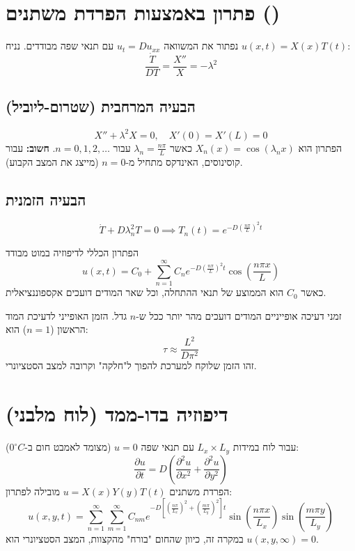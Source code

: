 \section{פתרון באמצעות הפרדת משתנים ()}
נפתור את המשוואה $u_t = D u_{xx}$ עם תנאי שפה מבודדים. נניח $u(x,t) = X(x)T(t)$:
\[ \frac{\dot{T}}{DT} = \frac{X''}{X} = -\lambda^2 \]

\subsection{הבעיה המרחבית (שטרום-ליוביל)}
\[ X'' + \lambda^2 X = 0, \quad X'(0) = X'(L) = 0 \]
הפתרון הוא $X_n(x) = \cos(\lambda_n x)$ כאשר $\lambda_n = \frac{n\pi}{L}$ עבור $n=0, 1, 2, \dots$. 
\textbf{חשוב:} עבור קוסינוסים, האינדקס מתחיל מ-$n=0$ (מייצג את המצב הקבוע).

\subsection{הבעיה הזמנית}
\[ \dot{T} + D\lambda_n^2 T = 0 \implies T_n(t) = e^{-D \left(\frac{n\pi}{L}\right)^2 t} \]

\begin{resultbox}{הפתרון הכללי לדיפוזיה במוט מבודד}
\[ u(x,t) = C_0 + \sum_{n=1}^\infty C_n e^{-D \left(\frac{n\pi}{L}\right)^2 t} \cos\left(\frac{n\pi x}{L}\right) \]
כאשר $C_0$ הוא הממוצע של תנאי ההתחלה, וכל שאר המודים דועכים אקספוננציאלית.
\end{resultbox}

\begin{notebox}{זמני דעיכה אופייניים}
המודים דועכים מהר יותר ככל ש-$n$ גדל. הזמן האופייני לדעיכת המוד הראשון ($n=1$) הוא:
\[ \tau \approx \frac{L^2}{D \pi^2} \]
זהו הזמן שלוקח למערכת להפוך ל"חלקה" וקרובה למצב הסטציונרי.
\end{notebox}

\section{דיפוזיה בדו-ממד (לוח מלבני)}
עבור לוח במידות $L_x \times L_y$ עם תנאי שפה $u=0$ (מצומד לאמבט חום ב-$0^\circ C$):
\[ \frac{\partial u}{\partial t} = D \left( \frac{\partial^2 u}{\partial x^2} + \frac{\partial^2 u}{\partial y^2} \right) \]
הפרדת משתנים $u = X(x)Y(y)T(t)$ מובילה לפתרון:
\[ u(x,y,t) = \sum_{n=1}^\infty \sum_{m=1}^\infty C_{nm} e^{-D \left[ \left(\frac{n\pi}{L_x}\right)^2 + \left(\frac{m\pi}{L_y}\right)^2 \right] t} \sin\left(\frac{n\pi x}{L_x}\right) \sin\left(\frac{m\pi y}{L_y}\right) \]
במקרה זה, כיוון שהחום "בורח" מהקצוות, המצב הסטציונרי הוא $u(x,y, \infty) = 0$.

